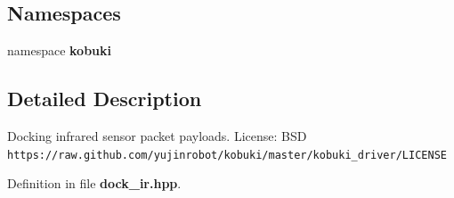 \subsection*{\-Namespaces}
\begin{DoxyCompactItemize}
\item 
namespace {\bf kobuki}
\end{DoxyCompactItemize}


\subsection{\-Detailed \-Description}
\-Docking infrared sensor packet payloads. \-License\-: \-B\-S\-D {\tt https\-://raw.\-github.\-com/yujinrobot/kobuki/master/kobuki\-\_\-driver/\-L\-I\-C\-E\-N\-S\-E} 

\-Definition in file {\bf dock\-\_\-ir.\-hpp}.

